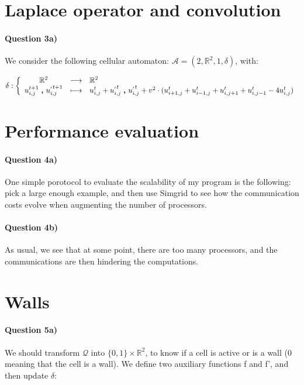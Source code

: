 \documentclass[a4paper,12pt]{article}
\begin{document}
\section{Laplace operator and convolution}

\paragraph{Question 3a)} We consider the following cellular automaton: $\mathcal{A} = (2, \mathbb{R}^2, 1, \delta)$, with:

\begin{eqnarray*}
\delta : \left \{ \begin{array}{c c l }
  \mathbb{R}^2 & \longrightarrow & \mathbb{R}^2 \\
  u^{t+1}_{i,j}\ \pmb{,} \ u^{_{'} t+1}_{i,j} & \longmapsto & u^{t}_{i,j} + u^{_{'} t}_{i,j}\ \pmb{,} \ u^{_{'} t}_{i,j} + v^2 \cdot (u^t_{i+1,j} + u^t_{i-1, j} + u^t_{i, j+1} + u^t_{i, j-1} - 4 u^t_{i, j})\\
  \end{array} \right .
\end{eqnarray*}


\section{Performance evaluation}

\paragraph{Question 4a)} One simple porotocol to evaluate the scalability of my program is the following: pick a large enough example, and then use Simgrid to see how the communication costs evolve when augmenting the number of processors.

\paragraph{Question 4b)} As usual, we see that at some point, there are too many processors, and the communications are then hindering the computations.


\section{Walls}

\paragraph{Question 5a)} We should transform $\mathcal{Q}$ into $\{0, 1\} \times \mathbb{R}^2$, to know if a cell is active or is a wall (0 meaning that the cell is a wall). We define two auxiliary functions f and f', and then update $\delta$: 
\end{document}
